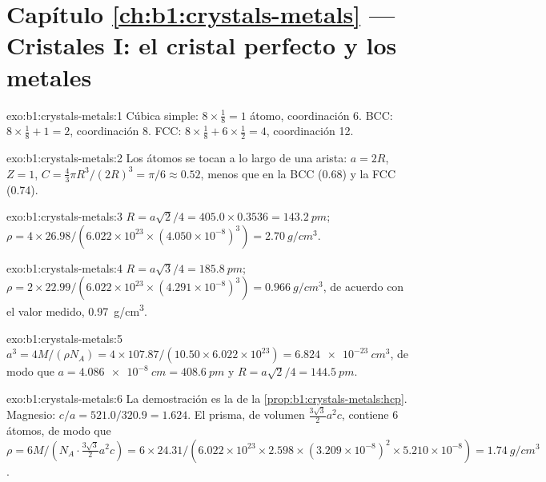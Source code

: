 \section*{Capítulo \ref{ch:b1:crystals-metals} --- Cristales I: el cristal perfecto y los metales}

\begin{solution}{exo:b1:crystals-metals:1}
Cúbica simple: $8 \times \frac18 = 1$ átomo, coordinación 6. BCC: $8 \times
\frac18 + 1 = 2$, coordinación 8. FCC: $8 \times \frac18 + 6 \times
\frac12 = 4$, coordinación 12.
\end{solution}

\begin{solution}{exo:b1:crystals-metals:2}
Los átomos se tocan a lo largo de una arista: $a = 2R$, $Z = 1$, $C = \frac43\pi R^3/(2R)^3
= \pi/6 \approx 0.52$, menos que en la BCC (0.68) y la FCC (0.74).
\end{solution}

\begin{solution}{exo:b1:crystals-metals:3}
$R = a\sqrt2/4 = 405.0 \times 0.3536 = \qty{143.2}{pm}$;
$\rho = 4 \times 26.98/(6.022 \times 10^{23} \times (4.050 \times
10^{-8})^3) = \qty{2.70}{g/cm^3}$.
\end{solution}

\begin{solution}{exo:b1:crystals-metals:4}
$R = a\sqrt3/4 = \qty{185.8}{pm}$; $\rho = 2 \times 22.99/(6.022 \times
10^{23} \times (4.291 \times 10^{-8})^3) = \qty{0.966}{g/cm^3}$, de
acuerdo con el valor medido, \qty{0.97}{g/cm^3}.
\end{solution}

\begin{solution}{exo:b1:crystals-metals:5}
$a^3 = 4M/(\rho N_A) = 4 \times 107.87/(10.50 \times 6.022 \times 10^{23}) =
\qty{6.824e-23}{cm^3}$, de modo que $a = \qty{4.086e-8}{cm} = \qty{408.6}{pm}$ y
$R = a\sqrt2/4 = \qty{144.5}{pm}$.
\end{solution}

\begin{solution}{exo:b1:crystals-metals:6}
La demostración es la de la \cref{prop:b1:crystals-metals:hcp}. Magnesio:
$c/a = 521.0/320.9 = 1.624$. El prisma, de volumen
$\frac{3\sqrt3}{2}a^2c$, contiene 6 átomos, de modo que $\rho = 6M/(N_A \cdot
\frac{3\sqrt3}{2}a^2c) = 6 \times 24.31/(6.022 \times 10^{23} \times
2.598 \times (3.209 \times 10^{-8})^2 \times 5.210 \times 10^{-8}) =
\qty{1.74}{g/cm^3}$.
\end{solution}

